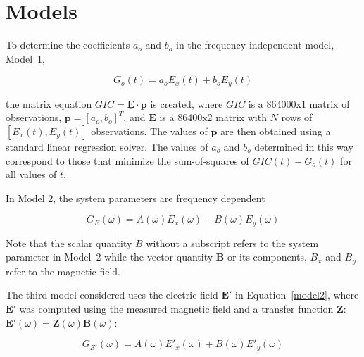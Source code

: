 \documentclass[draft,linenumbers]{agujournal2018}
\begin{document}
\section{Models}

To determine the coefficients $a_o$ and $b_o$ in the frequency independent model, Model~1,

\begin{linenomath*}
\begin{equation}
G_o(t) = a_oE_x(t) + b_oE_y(t)
\label{model1}
\end{equation}
\end{linenomath*}

\noindent
the matrix equation $GIC = \underline{\mathbf{E}}\cdot\mathbf{p}$ is created, where $GIC$ is a 864000x1 matrix of observations, $\mathbf{p} = [a_o,b_o]^T$, and $\underline{\mathbf{E}}$ is a 86400x2 matrix with $N$ rows of $[E_x(t), E_y(t)]$ observations. The values of $\mathbf{p}$ are then obtained using a standard linear regression solver. The values of $a_o$ and $b_o$ determined in this way correspond to those that minimize the sum-of-squares of $GIC(t)-G_o(t)$ for all values of $t$. \citep[][ provided the mathematically equivalent closed-form equations.]{Pulkkinen2007}

In Model 2, the system parameters are frequency dependent

\begin{linenomath*}
\begin{equation}
G_E(\omega) = A(\omega)E_x(\omega) + B(\omega)E_y(\omega)
\label{model2}
\tag{2a}
\end{equation}
\end{linenomath*}

Note that the scalar quantity $B$ without a subscript refers to the system parameter in Model~2 while the vector quantity $\mathbf{B}$ or its components, $B_x$ and $B_y$ refer to the magnetic field.

The third model considered uses the electric field $\mathbf{E}'$ in Equation~\ref{model2}, where $\mathbf{E}'$ was computed using the measured magnetic field and a transfer function $\mathbf{Z}$: $\mathbf{E}'(\omega) = \mathbf{Z}(\omega)\mathbf{B}(\omega)$:

\setcounter{equation}{2}
\begin{linenomath*}
\begin{equation}
G_{E'}(\omega) = A(\omega)E'_x(\omega) + B(\omega)E'_y(\omega)
\end{equation}
\end{linenomath*}
\end{document}

